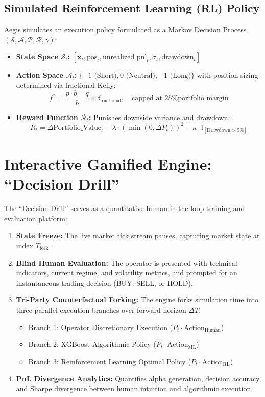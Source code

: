 \documentclass[11pt,a4paper]{article}
\begin{document}
\subsection{Simulated Reinforcement Learning (RL) Policy}
Aegis simulates an execution policy formulated as a Markov Decision Process $(\mathcal{S}, \mathcal{A}, \mathcal{P}, \mathcal{R}, \gamma)$:
\begin{itemize}[leftmargin=1.5em]
  \item \textbf{State Space $\mathcal{S}_t$:} $[\mathbf{x}_t, \text{pos}_t, \text{unrealized\_pnl}_t, \sigma_t, \text{drawdown}_t]$
  \item \textbf{Action Space $\mathcal{A}_t$:} $\{-1 \text{ (Short)}, 0 \text{ (Neutral)}, +1 \text{ (Long)}\}$ with position sizing determined via fractional Kelly:
  $$f^* = \frac{p \cdot b - q}{b} \times \delta_{\text{fractional}}, \quad \text{capped at 25\% portfolio margin}$$
  \item \textbf{Reward Function $\mathcal{R}_t$:} Punishes downside variance and drawdown:
  $$R_t = \Delta \text{Portfolio\_Value}_t - \lambda \cdot (\min(0, \Delta P_t))^2 - \kappa \cdot \mathbb{I}_{[\text{Drawdown} > 5\%]}$$
\end{itemize}

\section{Interactive Gamified Engine: ``Decision Drill''}

The ``Decision Drill'' serves as a quantitative human-in-the-loop training and evaluation platform:
\begin{enumerate}[leftmargin=1.5em]
  \item \textbf{State Freeze:} The live market tick stream pauses, capturing market state at index $T_{\text{fork}}$.
  \item \textbf{Blind Human Evaluation:} The operator is presented with technical indicators, current regime, and volatility metrics, and prompted for an instantaneous trading decision (BUY, SELL, or HOLD).
  \item \textbf{Tri-Party Counterfactual Forking:} The engine forks simulation time into three parallel execution branches over forward horizon $\Delta T$:
  \begin{itemize}
    \item Branch 1: Operator Discretionary Execution ($P_t \cdot \text{Action}_{\text{Human}}$)
    \item Branch 2: XGBoost Algorithmic Policy ($P_t \cdot \text{Action}_{\text{ML}}$)
    \item Branch 3: Reinforcement Learning Optimal Policy ($P_t \cdot \text{Action}_{\text{RL}}$)
  \end{itemize}
  \item \textbf{PnL Divergence Analytics:} Quantifies alpha generation, decision accuracy, and Sharpe divergence between human intuition and algorithmic execution.
\end{enumerate}
\end{document}
